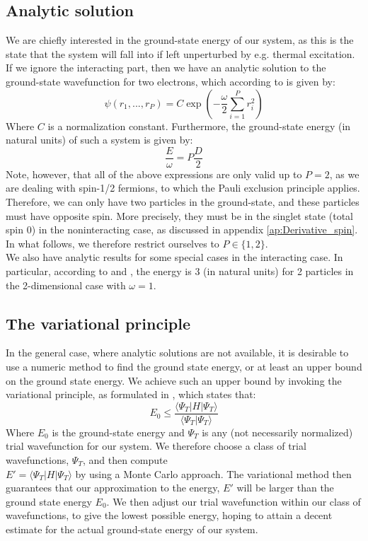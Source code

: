 \documentclass[a4paper, 10pt]{article}
\begin{document}
	\subsection{Analytic solution}
	We are chiefly interested in the ground-state energy of our system, as this is the state that the system will fall into if left unperturbed by e.g. thermal excitation. If we ignore the interacting part, then we have an analytic solution to the ground-state wavefunction for two electrons, which according to \cite{Griffiths2004} is given by:
	\begin{equation}
	\psi(r_1,...,r_P)=C\exp\left(-\frac{\omega}{2}\sum_{i=1}^P r_i^2\right)
	\end{equation}
	Where $C$ is a normalization constant. Furthermore, the ground-state energy (in natural units) of such a system is given by:
	\begin{equation}\label{eq:Ground-state-energy}
	\frac{E}{\omega}=P\frac{D}{2}
	\end{equation}
	Note, however, that all of the above expressions are only valid up to $P=2$, as we are dealing with spin-1/2 fermions, to which the Pauli exclusion principle applies. Therefore, we can only have two particles in the ground-state, and these particles must have opposite spin. More precisely, they must be in the singlet state (total spin $0$) in the noninteracting case, as discussed in appendix \ref{ap:Derivative_spin}. In what follows, we therefore restrict ourselves to $P\in \{1,2\}$.\\
	\linebreak
	We also have analytic results for some special cases in the interacting case. In particular, according to \cite{0305-4470-27-3-040} and \cite{PhysRevB.84.115302}, the energy is $3$ (in natural units) for 2 particles in the 2-dimensional case with $\omega=1$.
	\subsection{The variational principle}
	 In the general case, where analytic solutions are not available, it is desirable to use a numeric method to find the ground state energy, or at least an upper bound on the ground state energy. We achieve such an upper bound by invoking the variational principle, as formulated in \cite{Griffiths2004}, which states that:
	\begin{equation}\label{eq:Variational_Principle}
	E_0\leq \frac{\langle \Psi_T | H |\Psi_T \rangle}{\langle \Psi_T | \Psi_T \rangle}
	\end{equation} 
	Where $E_0$ is the ground-state energy and $\Psi_T$ is any (not necessarily normalized) trial wavefunction for our system. We therefore choose a class of trial wavefunctions, $\Psi_T$, and then compute\\ $E'=\langle \Psi_T | H |\Psi_T\rangle$ by using a Monte Carlo approach. The variational method then guarantees that our approximation to the energy, $E'$ will be larger than the ground state energy $E_0$. We then adjust our trial wavefunction within our class of wavefunctions, to give the lowest possible energy, hoping to attain a decent estimate for the actual ground-state energy of our system. 
\end{document}

